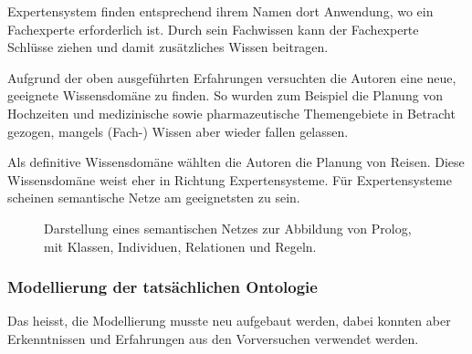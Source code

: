 Expertensystem finden entsprechend ihrem Namen dort Anwendung, wo ein Fachexperte erforderlich ist. Durch sein Fachwissen kann der Fachexperte Schlüsse ziehen und damit zusätzliches Wissen beitragen.

Aufgrund der oben ausgeführten Erfahrungen versuchten die Autoren eine neue, geeignete Wissensdomäne zu finden. So wurden zum Beispiel die Planung von Hochzeiten und medizinische sowie pharmazeutische Themengebiete in Betracht gezogen, mangels (Fach-) Wissen aber wieder fallen gelassen.

Als definitive Wissensdomäne wählten die Autoren die Planung von Reisen. Diese Wissensdomäne weist eher in Richtung Expertensysteme. Für Expertensysteme scheinen semantische Netze am geeignetsten zu sein.

\begin{figure}[H]
\centering {}
\caption{Darstellung eines semantischen Netzes zur Abbildung von Prolog, mit Klassen, Individuen, Relationen und Regeln.\label{fig:prolog_netz}\protect\footnotemark}
\end{figure}

\subsubsection{Modellierung der tatsächlichen Ontologie}
\label{sub:modellierung_der_ontologie_tatsaechliche}
Das heisst, die Modellierung musste neu aufgebaut werden, dabei konnten aber Erkenntnissen und Erfahrungen aus den Vorversuchen verwendet werden.

